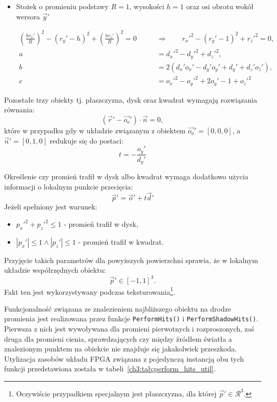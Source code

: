 \begin{enumerate}
\begin{itemize}
\item Stożek o promieniu podstawy $R=1$, wysokości $h = 1$ oraz osi obrotu wokół wersora $\vec{y}'$

\begin{align*}
\left(\frac{hr_x'}{R} \right)^2 - (r_y' - h)^2 + \left(\frac{hr_z'}{R} \right)^2 = 0\qquad &\Rightarrow\qquad r_x'^2 - (r_y' - 1)^2 + r_z'^2 = 0,\\
a &= d_x'^2 - d_y'^2 + d_z'^2,\\
b &= 2\left(d_x'o_x' - d_y'o_y' + d_y' + d_z'o_z'\right),\\
c &= o_x'^2 - o_y'^2 + 2o_y' - 1 + o_z'^2
\end{align*}

\end{itemize}

Pozostałe trzy obiekty tj. płaszczyzna, dysk oraz kwadrat wymagają rozwiązania równania:
\begin{equation*}
(\vec{r}' - \vec{o_o}') \cdot \vec{n} = 0,
\end{equation*}
które w przypadku gdy w układzie związanym z obiektem $\vec{o_o}' = [0,0,0]$, a $\vec{n}' = [0, 1, 0]$ redukuje się do postaci:
\begin{equation*}
t = -\frac{o_y'}{d_y'}
\end{equation*}

Określenie czy promień trafił w dysk albo kwadrat wymaga dodatkowo użycia informacji o lokalnym punkcie przecięcia:
\begin{equation}
\vec{p}' = \vec{o}' + t\vec{d}'
\end{equation}
Jeżeli spełniony jest warunek:
\begin{itemize}
\item $p_x'^2 + p_z'^2 \leq 1$ - promień trafił w dysk,
\item $|p_x'| \leq 1 \wedge |p_z'| \leq 1$ - promień trafił w kwadrat.
\end{itemize}
Przyjęcie takich parametrów dla powyższych powierzchni sprawia, że w lokalnym układzie współrzędnych obiektu:
\begin{equation*}
\vec{p}'\in [-1, 1]^3.
\end{equation*}
Fakt ten jest wykorzystywany podczas teksturowania\footnote{Oczywiście przypadkiem specjalnym jest płaszczyzna, dla której $\vec{p}'\in \mathcal{R}^3$.}.

Funkcjonalność związana ze znalezieniem najbliższego obiektu na drodze promienia jest realizowana przez funkcje \texttt{PerformHits()} i \texttt{PerformShadowHits()}. Pierwsza z nich jest wywoływana dla promieni pierwotnych i rozproszonych, zaś druga dla promieni cienia, sprawdzających czy między źródłem światła a znalezionym punktem na obiekcie nie znajduje się jakakolwiek przeszkoda. Utylizacja zasobów układu FPGA związana z pojedynczą instancją obu tych funkcji przedstawiona została w tabeli~\ref{ch3:tab:perform_hits_util}.


\end{enumerate}
